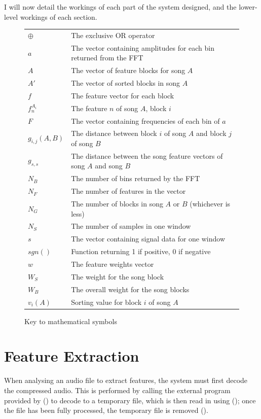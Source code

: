 I will now detail the workings of each part of the system designed, and the lower-level workings of each section.
\begin{figure}[ht]
	\caption{Key to mathematical symbols}
	\begin{tabular}{l l}
		$\oplus$		& The exclusive OR operator \\
		$a$				& The vector containing amplitudes for each bin returned from the FFT \\
		$A$				& The vector of feature blocks for song $A$ \\
		$A'$			& The vector of sorted blocks in song $A$ \\
		$f$				& The feature vector for each block \\
		$f_n^{A_{i}}$	& The feature $n$ of song $A$, block $i$ \\
		$F$				& The vector containing frequencies of each bin of $a$ \\
		$g_{i,j}(A,B)$	& The distance between block $i$ of song $A$ and block $j$ of song $B$ \\
		$g_{s,s}$		& The distance between the song feature vectors of song $A$ and song $B$ \\
		$N_B$			& The number of bins returned by the FFT \\
		$N_F$			& The number of features in the vector \\
		$N_G$			& The number of blocks in song $A$ or $B$ (whichever is less) \\
		$N_S$			& The number of samples in one window \\
		$s$				& The vector containing signal data for one window \\
		$sgn()$			& Function returning 1 if positive, 0 if negative \\
		$w$				& The feature weights vector \\
		$W_S$			& The weight for the song block \\
		$W_B$			& The overall weight for the song blocks \\
		$v_i(A)$		& Sorting value for block $i$ of song $A$ \\
	\end{tabular}
\end{figure}
\section{Feature Extraction}
When analysing an audio file to extract features, the system must first decode the compressed audio. This is performed by calling the external  program provided by  () to decode to a temporary file, which is then read in using  (); once the file has been fully processed, the temporary file is removed ().

